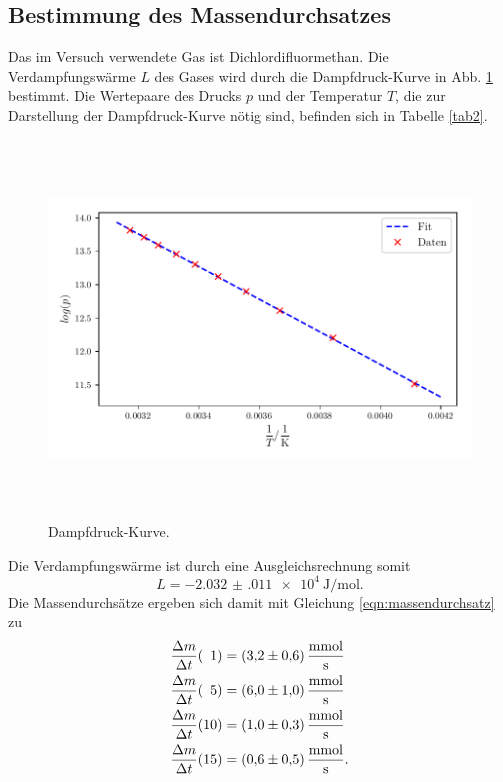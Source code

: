 \subsection{Bestimmung des Massendurchsatzes}
Das im Versuch verwendete Gas ist Dichlordifluormethan.
Die Verdampfungswärme $L$ des Gases wird durch die Dampfdruck-Kurve
in Abb. \ref{fig:plot2} bestimmt. %
Die Wertepaare des Drucks $p$ und der Temperatur $T$, die zur
Darstellung der Dampfdruck-Kurve nötig sind, befinden sich in
Tabelle \ref{tab2}. 

\begin{figure}
    \centering
    \includegraphics[width=14cm, height=10cm]{build/plot2.pdf}
    \caption{Dampfdruck-Kurve.}
    \label{fig:plot2}
\end{figure}
\noindent Die Verdampfungswärme ist durch eine Ausgleichsrechnung somit %
\begin{equation*}
    L = \SI{-2.032(011)e4}{\joule\per\mol}. %
\end{equation*}
Die Massendurchsätze ergeben sich damit mit Gleichung \eqref{eqn:massendurchsatz} zu %
\begin{align*}
    \frac{\Delta m}{\Delta t}(\phantom{1}1) &= \SI{3.2 \pm 0.6}{\milli\mol\per\second} \\
    \frac{\Delta m}{\Delta t}(\phantom{1}5) &= \SI{6.0 \pm 1.0}{\milli\mol\per\second} \\
    \frac{\Delta m}{\Delta t}(10) &= \SI{1.0 \pm 0.3}{\milli\mol\per\second} \\
    \frac{\Delta m}{\Delta t}(15) &= \SI{0.6 \pm 0.5}{\milli\mol\per\second}. %
\end{align*}

